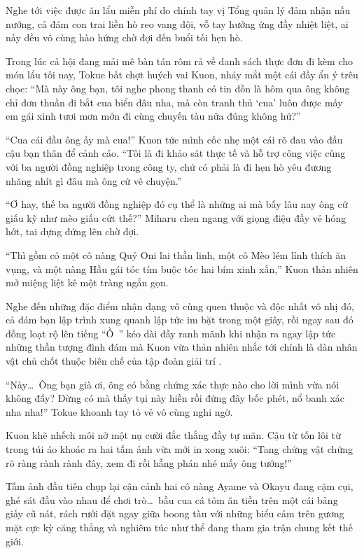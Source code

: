 \documentclass[../main.tex]{subfiles}
\begin{document}
Nghe tới việc được ăn lẩu miễn phí do chính tay vị Tổng quản lý đảm nhận nấu nướng, cả đám con trai liền hò reo vang dội, vỗ tay hưởng ứng đầy nhiệt liệt, ai nấy đều vô cùng hào hứng chờ đợi đến buổi tối hẹn hò.
\ct

Trong lúc cả hội đang mải mê bàn tán rôm rả về danh sách thực đơn đi kèm cho món lẩu tối nay, Tokue bất chợt huých vai Kuon, nháy mắt một cái đầy ẩn ý trêu chọc: ``Mà này ông bạn, tôi nghe phong thanh có tin đồn là hôm qua ông không chỉ đơn thuần đi bắt cua biển đâu nha, mà còn tranh thủ `cua' luôn được mấy em gái xinh tươi mơn mởn đi cùng chuyến tàu nữa đúng không hử?''

``Cua cái đầu ông ấy mà cua!'' Kuon tức mình cốc nhẹ một cái rõ đau vào đầu cậu bạn thân để cảnh cáo. ``Tôi là đi khảo sát thực tế và hỗ trợ công việc cùng với ba người đồng nghiệp trong công ty, chứ có phải là đi hẹn hò yêu đương nhăng nhít gì đâu mà ông cứ vẽ chuyện.''

``Ơ hay, thế ba người đồng nghiệp đó cụ thể là những ai mà bấy lâu nay ông cứ giấu kỹ như mèo giấu cứt thế?'' Miharu chen ngang với giọng điệu đầy vẻ hóng hớt, tai dựng đứng lên chờ đợi.

``Thì gồm có một cô nàng Quỷ Oni lai thần linh, một cô Mèo lém lỉnh thích ăn vụng, và một nàng Hầu gái tóc tím buộc tóc hai bím xinh xắn,'' Kuon thản nhiên mở miệng liệt kê một tràng ngắn gọn.

Nghe đến những đặc điểm nhận dạng vô cùng quen thuộc và độc nhất vô nhị đó, cả đám bạn lập trình xung quanh lập tức im bặt trong một giây, rồi ngay sau đó đồng loạt rộ lên tiếng ``Ồ~'' kéo dài đầy ranh mãnh khi nhận ra ngay lập tức những thần tượng đình đám mà Kuon vừa thản nhiên nhắc tới chính là dàn nhân vật chủ chốt thuộc biên chế của tập đoàn giải trí \hll.

``Này\dots\ Ông bạn già ơi, ông có bằng chứng xác thực nào cho lời mình vừa nói không đấy? Đừng có mà thấy tụi này hiền rồi đứng đây bốc phét, nổ banh xác nha nha!'' Tokue khoanh tay tỏ vẻ vô cùng nghi ngờ.

Kuon khẽ nhếch môi nở một nụ cười đắc thắng đầy tự mãn. Cậu từ tốn lôi từ trong túi áo khoác ra hai tấm ảnh vừa mới in xong xuôi: ``Tang chứng vật chứng rõ ràng rành rành đây, xem đi rồi hẵng phán nhé mấy ông tướng!''

Tấm ảnh đầu tiên chụp lại cận cảnh hai cô nàng Ayame và Okayu đang cặm cụi, ghé sát đầu vào nhau để chơi trò\dots\ bầu cua cá tôm ăn tiền trên một cái bảng giấy cũ nát, rách rưới đặt ngay giữa boong tàu với những biểu cảm trên gương mặt cực kỳ căng thẳng và nghiêm túc như thể đang tham gia trận chung kết thế giới.
\end{document}
